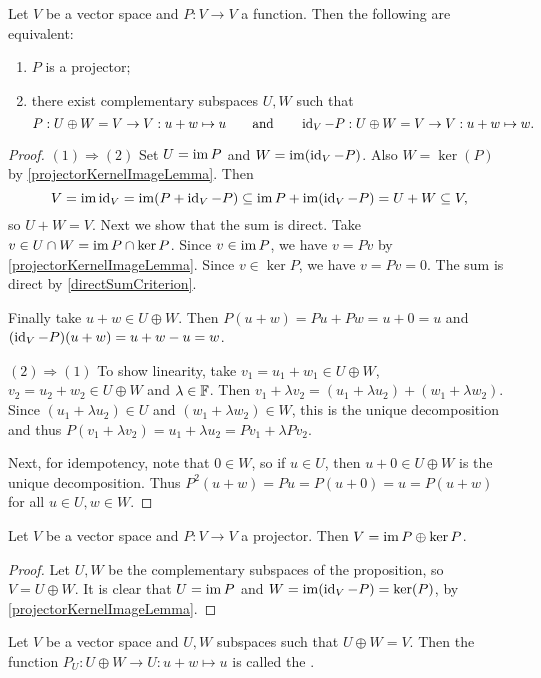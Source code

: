 \begin{proposition} \label{projectorComplementarySubspaces}
Let $V$ be a vector space and $P: V\to V$ a function. Then the following are equivalent:
\begin{enumerate}
\item $P$ is a projector;
\item there exist complementary subspaces $U,W$ such that
\[ P: U\oplus W = V \to V: u+w \mapsto u \qquad\text{and}\qquad \operatorname{id}_V - P: U\oplus W = V \to V: u+w \mapsto w. \]
\end{enumerate}
\end{proposition}
\begin{proof}
$(1) \Rightarrow (2)$ Set $U = \operatorname{im} P$ and $W = \operatorname{im}(\operatorname{id}_V - P)$. Also $W = \ker(P)$ by \ref{projectorKernelImageLemma}. Then
\[ V = \operatorname{im}\operatorname{id}_V = \operatorname{im}(P + \operatorname{id}_V - P) \subseteq \operatorname{im} P + \operatorname{im}(\operatorname{id}_V - P) = U + W \subseteq V, \]
so $U+W = V$. Next we show that the sum is direct. Take $v\in U \cap W = \operatorname{im} P \cap \ker P$. Since $v\in \operatorname{im} P$, we have $v= Pv$ by \ref{projectorKernelImageLemma}. Since $v\in \ker P$, we have $v= Pv = 0$. The sum is direct by \ref{directSumCriterion}.

Finally take $u+w\in U\oplus W$. Then $P(u+w) = Pu + Pw = u+0 = u$ and $(\operatorname{id}_V-P)(u+w) = u+w - u = w$.

$(2) \Rightarrow (1)$ To show linearity, take $v_1 = u_1 +w_1 \in U\oplus W$, $v_2 = u_2 +w_2 \in U\oplus W$ and $\lambda \in \mathbb{F}$. Then $v_1 + \lambda v_2 = (u_1 + \lambda u_2) + (w_1 + \lambda w_2)$. Since $(u_1 + \lambda u_2) \in U$ and $(w_1 + \lambda w_2) \in W$, this is the unique decomposition and thus $P(v_1 + \lambda v_2) = u_1 + \lambda u_2 = Pv_1 + \lambda Pv_2$.

Next, for idempotency, note that $0\in W$, so if $u\in U$, then $u+0\in U\oplus W$ is the unique decomposition. Thus $P^2(u+w) = Pu = P(u + 0) = u = P(u+w)$ for all $u\in U,w\in W$.
\end{proof}
\begin{corollary} \label{directSumKernelImageIdempotent}
Let $V$ be a vector space and $P: V\to V$ a projector. Then $V= \operatorname{im} P \oplus \ker P$.
\end{corollary}
\begin{proof}
Let $U,W$ be the complementary subspaces of the proposition, so $V = U\oplus W$. It is clear that $U = \operatorname{im} P$ and $W = \operatorname{im}(\operatorname{id}_V - P) = \ker(P)$, by \ref{projectorKernelImageLemma}.
\end{proof}

\begin{definition}
Let $V$ be a vector space and $U,W$ subspaces such that $U\oplus W = V$. Then the function $P_U: U\oplus W \to U: u+w \mapsto u$ is called the .
\end{definition}

